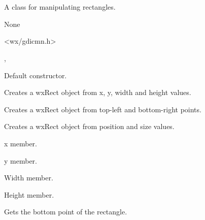\section{}\label{wxrect}

A class for manipulating rectangles.


None


<wx/gdicmn.h>


, 




Default constructor.


Creates a wxRect object from x, y, width and height values.


Creates a wxRect object from top-left and bottom-right points.


Creates a wxRect object from position and size values.



x member.



y member.



Width member.



Height member.

\label{wxrectgetbottom}


Gets the bottom point of the rectangle.

